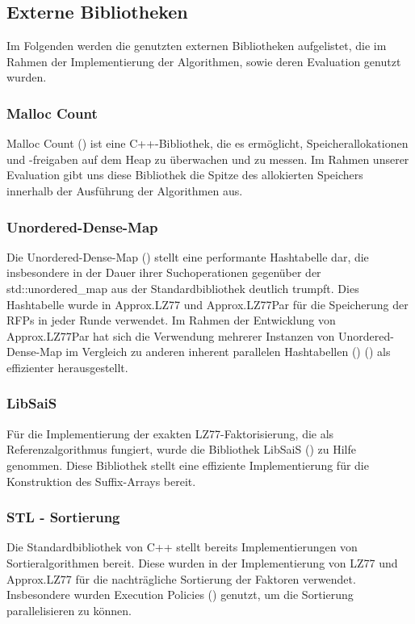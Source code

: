 \subsection{Externe Bibliotheken}
Im Folgenden werden die genutzten externen Bibliotheken aufgelistet, die im Rahmen der Implementierung der Algorithmen, sowie deren Evaluation genutzt wurden.
\subsubsection{Malloc Count} \label{malloccount}
Malloc Count (\cite{malloc_count}) ist eine C++-Bibliothek, die es ermöglicht, Speicherallokationen und -freigaben auf dem Heap zu überwachen und zu messen. Im
Rahmen unserer Evaluation gibt uns diese Bibliothek die Spitze des allokierten Speichers innerhalb der Ausführung der Algorithmen aus.

\subsubsection{Unordered-Dense-Map} \label{unordereddense}
Die Unordered-Dense-Map (\cite{unordered_dense}) stellt eine performante Hashtabelle dar, die insbesondere in der Dauer ihrer Suchoperationen gegenüber
der std::unordered\_map aus der Standardbibliothek deutlich trumpft. Dies Hashtabelle wurde in Approx.LZ77 und Approx.LZ77Par für die Speicherung der
RFPs in jeder Runde verwendet. Im Rahmen der Entwicklung von Approx.LZ77Par hat sich die Verwendung mehrerer Instanzen von Unordered-Dense-Map im Vergleich
zu anderen inherent parallelen Hashtabellen (\cite{oneapi}) (\cite{sharded_map}) als effizienter herausgestellt.

\subsubsection{LibSaiS}
Für die Implementierung der exakten LZ77-Faktorisierung, die als Referenzalgorithmus fungiert, wurde die Bibliothek LibSaiS (\cite{libsais}) zu Hilfe genommen. Diese
Bibliothek stellt eine effiziente Implementierung für die Konstruktion des Suffix-Arrays bereit.

\subsubsection{STL - Sortierung}
Die Standardbibliothek von C++ stellt bereits Implementierungen von Sortieralgorithmen bereit. Diese wurden in der Implementierung von LZ77 und Approx.LZ77 für
die nachträgliche Sortierung der Faktoren verwendet. Insbesondere wurden Execution Policies (\cite{execpol}) genutzt, um die Sortierung parallelisieren zu können.

